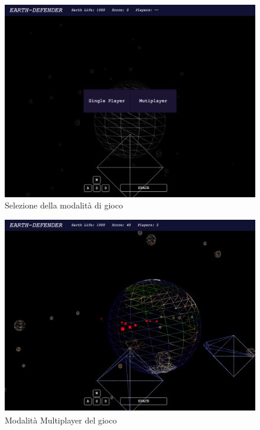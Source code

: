 \documentclass[paper=a4, fontsize=11pt]{scrartcl} %
\numberwithin{equation}{section} %
\numberwithin{figure}{section} %
\numberwithin{table}{section} %
\begin{document}
\begin{figure}
\centering
\includegraphics[width=\textwidth]{EarthDefenderGameMode}
\caption{Selezione della modalità di gioco}
\label{EarthDefenderGameMode}
\end{figure}

\begin{figure}
\centering
\includegraphics[width=\textwidth]{EarthDefenderMultiplayer}
\caption{Modalità Multiplayer del gioco}
\label{EarthDefenderMultiplayer}
\end{figure}
\end{document}
